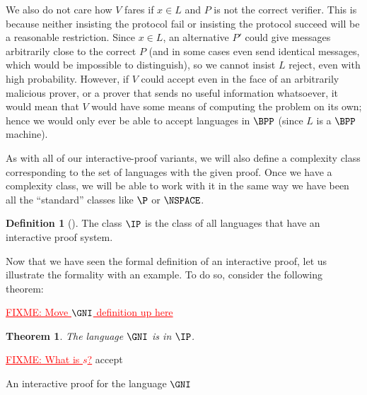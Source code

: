 \documentclass[english,12pt]{reedthesis}
\theoremstyle{plain}
\newtheorem{thm}{Theorem}[section]
\theoremstyle{definition}
\newtheorem{defn}[defn]{Definition}
\theoremstyle{remark}
\newcommand{\TODO}[1]{\textcolor{red}{TODO: #1}}
\newcommand{\FIXME}[1]{\textcolor{red}{\ul{FIXME: #1}}}
\begin{document}
We also do not care how $V$ fares if $x \in L$ and $P$ is not the correct
verifier. This is because neither insisting the protocol fail or insisting the
protocol succeed will be a reasonable restriction. Since $x \in L$, an alternative
$P'$ could give messages arbitrarily close to the correct $P$ (and in some cases
even send identical messages, which would be impossible to distinguish), so we
cannot insist $L$ reject, even with high probability. However, if $V$ could
accept even in the face of an arbitrarily malicious prover, or a prover that
sends no useful information whatsoever, it would mean that $V$ would have some
means of computing the problem on its own; hence we would only ever be able to
accept languages in $\BPP$ (since $L$ is a $\BPP$ machine).

As with all of our interactive-proof variants, we will also define a complexity
class corresponding to the set of languages with the given proof. Once we have a
complexity class, we will be able to work with it in the same way we have been
all the ``standard'' classes like $\P$ or $\NSPACE$.

\begin{defn}[{\cite[Def.\ 4.2.5]{Go01}}]\label{def:ip}
  The class $\IP$ is the class of all languages that have an interactive proof
  system.
\end{defn}

Now that we have seen the formal definition of an interactive proof, let us
illustrate the formality with an example. To do so, consider the following
theorem:



\FIXME{Move $\GNI$ definition up here}

\begin{thm}\label{thm:gni-ip}
  The language $\GNI$ is in $\IP$.
\end{thm}

\begin{algorithm}[htbp]
  \FIXME{What is $s$?}\;
  accept\;
  \caption{An interactive proof for the language $\GNI$}\label{alg:gni-ip}
\end{algorithm}
\end{document}
